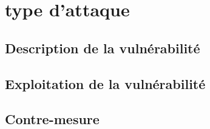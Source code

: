 \newpage

\section{type d'attaque}

\subsection{Description de la vulnérabilité}

\subsection{Exploitation de la vulnérabilité}

\subsection{Contre-mesure}








